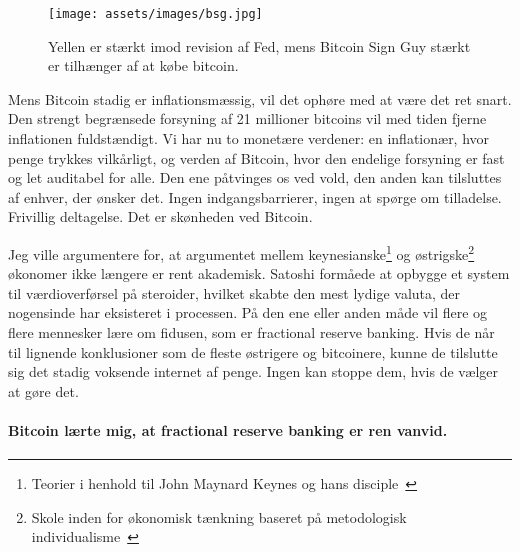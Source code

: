\begin{figure}[htbp]
  \centering
  \texttt{[image: assets/images/bsg.jpg]}
  \caption{Yellen er stærkt imod revision af Fed, mens Bitcoin Sign Guy 
  stærkt er tilhænger af at købe bitcoin.}
  \label{fig:bsg}
\end{figure}

Mens Bitcoin stadig er inflationsmæssig, vil det ophøre med at være det ret 
snart. Den strengt begrænsede forsyning af 21 millioner bitcoins vil med 
tiden fjerne inflationen fuldstændigt. Vi har nu to monetære verdener: en
inflationær, hvor penge trykkes vilkårligt, og verden af
Bitcoin, hvor den endelige forsyning er fast og let auditabel for alle.
Den ene påtvinges os ved vold, den anden kan tilsluttes af enhver, der ønsker
det. Ingen indgangsbarrierer, ingen at spørge om tilladelse.
Frivillig deltagelse. Det er skønheden ved Bitcoin.

Jeg ville argumentere for, at argumentet mellem keynesianske\footnote{Teorier i
henhold til John Maynard Keynes og hans disciple~\cite{wiki:keynesian}} og
østrigske\footnote{Skole inden for økonomisk tænkning baseret på metodologisk
individualisme~\cite{wiki:austrian}} økonomer ikke længere er rent akademisk.
Satoshi formåede at opbygge et system til værdioverførsel på steroider, hvilket 
skabte den mest lydige valuta, der nogensinde har eksisteret i processen. På 
den ene eller anden måde vil flere og flere mennesker lære om fidusen, som er 
fractional reserve banking. Hvis de når til lignende konklusioner som de fleste 
østrigere og bitcoinere, kunne de tilslutte sig det stadig voksende internet af 
penge. Ingen kan stoppe dem, hvis de vælger at gøre det.

\paragraph{Bitcoin lærte mig, at fractional reserve banking er ren vanvid.}

%
%
%
%
%
